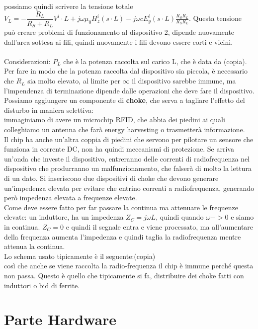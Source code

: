 \documentclass[oneside, 12pt]{extbook}
\begin{document}
possiamo quindi scrivere la tensione totale $V_L = - \dfrac{R_L}{R_S + R_L}V^i \cdot L + j \omega \mu_0 H_z^i (s\cdot L) - j \omega c E_y^i (s \cdot L) \frac{R_S R_L}{R_S R_L}$. Questa tensione può creare problemi di funzionamento al dispositivo 2, dipende nuovamente dall'area sottesa ai fili, quindi nuovamente i fili devono essere corti e vicini.\\\\Considerazioni: $P_L$ che è la potenza raccolta sul carico L, che è data da (copia). Per fare in modo che la potenza raccolta dal dispositivo sia piccola, è necessario che $R_L$ sia molto elevato, al limite per $\infty$ il dispositivo sarebbe immune, ma l'impendenza di terminazione dipende dalle operazioni che deve fare il dispositivo.\\Possiamo aggiungere un componente di \textbf{choke}, che serva a tagliare l'effetto del disturbo in maniera selettiva:\\immaginiamo di avere un microchip RFID, che abbia dei piedini ai quali colleghiamo un antenna che farà energy harvesting o trasmetterà informazione.\\Il chip ha anche un'altra coppia di piedini che servono per pilotare un sensore che funziona in corrente DC, non ha quindi meccanismi di protezione. Se arriva un'onda che investe il dispositivo, entreranno delle correnti di radiofrequenza nel dispositivo che produrranno un malfunzionamento, che falserà di molto la lettura di un dato. Si inseriscono due dispositivi di choke che devono generare un'impedenza elevata per evitare che entrino correnti a radiofrequenza, generando però impedenza elevata a frequenze elevate.\\Come deve essere fatto per far passare la continua ma attenuare le frequenze elevate: un induttore, ha un impedenza $Z_C = j \omega L$, quindi quando $\omega -> 0$ e siamo in continua. $Z_C = 0$ e quindi il segnale entra e viene processato, ma all'aumentare della frequenza aumenta l'impedenza e quindi taglia la radiofrequenza mentre attenua la continua.\\Lo schema usato tipicamente è il seguente:(copia)\\così che anche se viene raccolta la radio-frequenza il chip è immune perché questa non passa. Questo è quello che tipicamente si fa, distribuire dei choke fatti con induttori o bid di ferrite.

\part{Parte Hardware}
\end{document}
